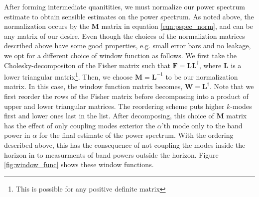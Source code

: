 \documentclass[twocolumn,numberedappendix]{emulateapj} \shorttitle{PSA64}
\begin{document}
After forming intermediate quanitities, we must normalize our power spectrum
estimate to obtain sensible estimates on the power spectrum. As noted above, the
normalization occurs by the $\mathbf{M}$ matrix in equation
\ref{eqn:pspec_norm}, and can be any matrix of our desire. 
Even though the choices of the normaliztion matrices described above have some
good properties, e.g. small error bars and no leakage, we opt for a different
choice of window function as follows. We first take the Cholesky-decompositon of
the Fisher matrix such that $\mathbf{F} = \mathbf{L}\mathbf{L}^{\dagger}$, where
$\mathbf{L}$ is a lower triangular matrix\footnote{This is possible for any
positive definite matrix}. Then, we choose ${\mathbf{M}} = \mathbf{L}^{-1}$ to
be our normalization matrix. In this case, the window function matrix becomes,
$\mathbf{W}=\mathbf{L}^{\dagger}$. Note that we first reorder the rows of the
Fisher matrix before decomposing into a product of upper and lower triangular
matrices. The reordering scheme puts higher $k$-modes first and lower ones last
in the list. After decomposing, this choice of $\mathbf{M}$ matrix has the
effect of only coupling modes exterior the $\alpha$'th mode only to the band
power in $\alpha$  for the final estimate of the power spectrum.  With the
ordering described above, this has the consequence of not coupling the modes
inside the horizon in to measurments of band powers outside the horizon. Figure
\ref{fig:window_func} shows these window functions. 
\end{document}
